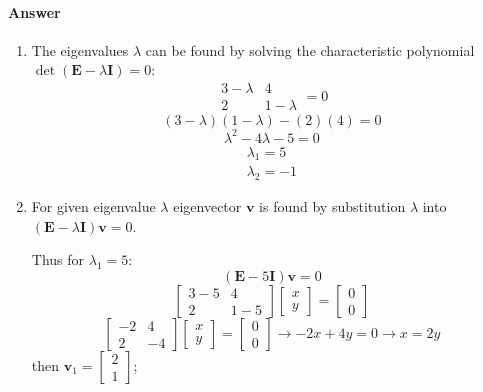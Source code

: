 \documentclass{article}
\begin{document}
\paragraph{Answer}
\begin{enumerate}
    \item The eigenvalues $\lambda$ can be found by solving the characteristic polynomial $ \det (\mathbf{E} - \lambda \mathbf{I})=0 $:
    $$ \begin{array}{|cc|} 3-\lambda & 4 \\ 2 & 1-\lambda \end{array} = 0$$
    $$ (3-\lambda)(1-\lambda)-(2)(4)=0 $$
    $$ \lambda^2 - 4\lambda - 5 =0$$
    $$ \begin{array}{c} \lambda_1 = 5 \\ \lambda_2 = -1 \end{array} $$
    \item For given eigenvalue $\lambda$ eigenvector $\mathbf{v}$ is found by substitution $\lambda$ into $(\mathbf{E} - \lambda \mathbf{I})\mathbf{v}=0$. 
    
    Thus for $\lambda_1=5$:
    $$ (\mathbf{E} - 5 \mathbf{I})\mathbf{v}=0$$
    $$ \left[ \begin{array}{cc} 3-5 & 4 \\ 2 & 1-5\end{array} \right] \left[ \begin{array}{c} x \\ y \end{array} \right] = \left[ \begin{array}{c} 0 \\ 0 \end{array} \right]$$
    $$ \left[ \begin{array}{cc} -2 & 4 \\ 2 & -4\end{array} \right] \left[ \begin{array}{c} x \\ y \end{array} \right] = \left[ \begin{array}{c} 0 \\ 0 \end{array} \right] \rightarrow -2x+4y=0 \rightarrow x=2y$$
    then $\mathbf{v}_1 = \left[ \begin{array}{c} 2 \\ 1 \end{array} \right]$;
    

\end{enumerate}
\end{document}
